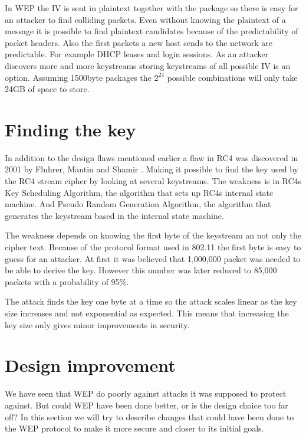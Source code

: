 \documentclass[twocolumn,11pt]{IEEEtran}
\begin{document}
In WEP the IV is sent in plaintext together with the package so there is easy for an attacker to find colliding packets. Even without knowing the plaintext of a message it is possible to find plaintext candidates because of the predictability of packet headers. Also the first packets a new host sends to the network are predictable. For example DHCP leases and login sessions. As an attacker discovers more and more keystreams storing keystreams of all possible IV is an option. Assuming 1500byte packages the $2^24$ possible combinations will only take 24GB of space to store.

\section {Finding the key}
\label{sec:find_key}
In addition to the design flaws mentioned earlier a flaw in RC4 was discovered in 2001 by Fluhrer, Mantin and Shamir \cite{Fluhrer:New}. Making it possible to find the key used by the RC4 stream cipher by looking at several keystreams. The weakness is in RC4s Key Scheduling Algorithm, the algorithm that sets up RC4s internal state machine. And Pseudo Random Generation Algorithm, the algorithm that generates the keystream based in the internal state machine.

The weakness depends on knowing the first byte of the keystream an not only the cipher text. Because of the protocol format used in 802.11 the first byte is easy to guess for an attacker. At first it was believed that 1,000,000 packet \cite{Fluhrer:New} was needed to be able to derive the key. However this number was later reduced to 85,000 packets with a probability of 95\%\cite{Tews:New}.

The attack finds the key one byte at a time so the attack scales linear as the key size increases and not exponential as expected. This means that increasing the key size only gives minor improvements in security.

\section{Design improvement}
\label{sec:improvement}

We have seen that WEP do poorly against attacks it was supposed to protect against. But could WEP have been done better, or is the design choice too far off? In this section we will try to describe changes that could have been done to the WEP protocol to make it more secure and closer to its initial goals.
\end{document}

